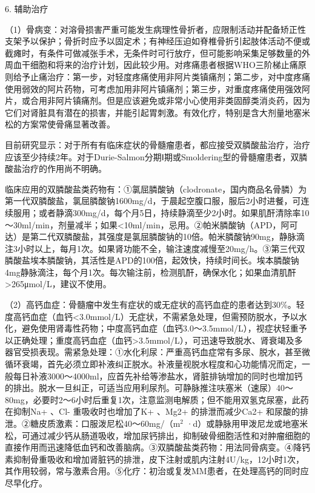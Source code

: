 6. 辅助治疗

（1）骨病变：对溶骨损害严重可能发生病理性骨折者，应限制活动并配备矫正性支架予以保护；骨折时应予以固定术；有神经压迫如脊椎骨折引起肢体活动不便或截瘫时，有条件可做减张手术，无条件时可行放疗，但可能影响采集足够数量的外周血干细胞和将来的治疗计划，因此较少用。对疼痛患者根据WHO三阶梯止痛原则给予止痛治疗：第一步，对轻度疼痛使用非阿片类镇痛剂；第二步，对中度疼痛使用弱效的阿片药物，可考虑加用非阿片镇痛剂；第三步，对重度疼痛使用强效阿片，或合用非阿片镇痛剂。但是应该避免或非常小心使用非类固醇类消炎药，因为它们对肾脏具有潜在的损害，并能引起胃刺激。有效化疗，特别是含大剂量地塞米松的方案常使骨痛显著改善。

目前研究显示：对于所有有临床症状的骨髓瘤患者，都应接受双膦酸盐治疗，治疗应该至少持续2年。对于Durie-Salmon分期Ⅰ期或Smoldering型的骨髓瘤患者，双膦酸盐治疗的作用尚不明确。

临床应用的双膦酸盐类药物有：①氯屈膦酸钠（clodronate，国内商品名骨膦）为第一代双膦酸盐，氯屈膦酸钠1600mg/d，于晨起空腹口服，服后2小时进餐，可连续服用；或者静滴300mg/d，每个月5日，持续静滴至少2小时。如果肌酐清除率10～30ml/min，剂量减半；如果<10ml/min，忌用。②帕米膦酸钠（APD，阿可达）是第二代双膦酸盐，其强度是氯屈膦酸钠的10倍。帕米膦酸钠90mg，静脉滴注3小时以上，每月1次。如果肾功能不全，输注速度减慢至20mg/h。③第三代双膦酸盐埃本膦酸钠，其活性是APD的100倍，起效快，持续时间长。埃本膦酸钠4mg静脉滴注，每个月1次。每次输注前，检测肌酐，确保水化；如果血清肌酐\textgreater{}265μmol/L，建议不使用。

（2）高钙血症：骨髓瘤中发生有症状的或无症状的高钙血症的患者达到30\%。轻度高钙血症（血钙<3.0mmol/L）无症状，不需紧急处理，但需预防脱水，予以水化，避免使用肾毒性药物；中度高钙血症（血钙3.0～3.5mmol/L），视症状轻重予以正确处理；重度高钙血症（血钙\textgreater{}3.5mmol/L），可迅速导致脱水、肾衰竭及多器官受损表现。需紧急处理：①水化利尿：严重高钙血症常有多尿、脱水，甚至微循环衰竭，首先必须立即补液纠正脱水。补液量视脱水程度和心功能情况而定，一般每日补液3000～4000ml，应首先补给等渗盐水，肾脏排钠增加的同时也增加钙的排出。脱水一旦纠正，可适当应用利尿剂。可静脉推注呋塞米（速尿）40～80mg，必要时2～6小时后重复1次，注意监测电解质；但不能用双氢克尿塞，此药在抑制Na{+}
、Cl{-} 重吸收时也增加了K{+} 、Mg{2+} 的排泄而减少Ca{2+}
和尿酸的排泄。②糖皮质激素：口服泼尼松40～60mg/（m$^2$
·d）或静脉用甲泼尼龙或地塞米松，可通过减少钙从肠道吸收，增加尿钙排出，抑制破骨细胞活性和对肿瘤细胞的直接作用而迅速降低血钙和改善脑病。③双膦酸盐类药物：用法同骨病变。④降钙素抑制骨重吸收和增加肾脏钙的排泄，皮下注射或肌内注射4U/kg，12小时1次，其作用较弱，常与激素合用。⑤化疗：初治或复发MM患者，在处理高钙的同时应尽早化疗。

